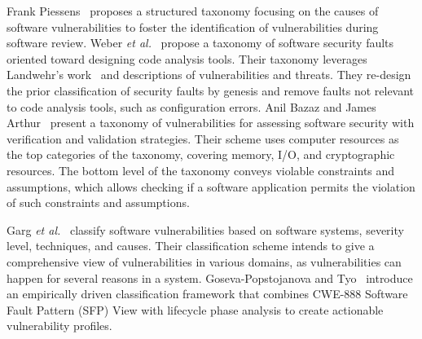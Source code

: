 \par
Frank Piessens~\cite{Piessens2002ATO} proposes a structured taxonomy focusing on the causes of software vulnerabilities to foster the identification of vulnerabilities during software review. Weber \textit{et al.}~\cite{Weber2005ASF} propose a taxonomy of software security faults oriented toward designing code analysis tools. Their taxonomy leverages Landwehr’s work~\cite{taxonomy_security_flaws} and descriptions of vulnerabilities and threats. They re-design the prior classification of security faults by genesis and remove faults not relevant to code analysis tools, such as configuration errors. Anil Bazaz and James Arthur~\cite{Bazaz2007TowardsAT} present a taxonomy of vulnerabilities for assessing software security with verification and validation strategies. Their scheme uses computer resources as the top categories of the taxonomy, covering memory, I/O, and cryptographic resources. The bottom level of the taxonomy conveys violable constraints and assumptions, which allows checking if a software application permits the violation of such constraints and assumptions.
\par
Garg \textit{et al.}~\cite{Garg2019AnalysisOS} classify software vulnerabilities based on software systems, severity level, techniques, and causes. Their classification scheme intends to give a comprehensive view of vulnerabilities in various domains, as vulnerabilities can happen for several reasons in a system. Goseva-Popstojanova and Tyo~\cite{GosevaPopstojanova2017SecurityVP} introduce an empirically driven classification framework that combines CWE-888 Software Fault Pattern (SFP) View with lifecycle phase analysis to create actionable vulnerability profiles. 
